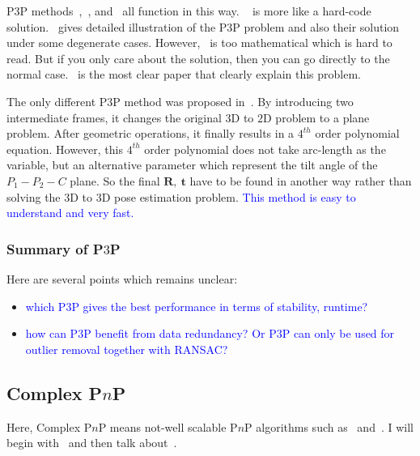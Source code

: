 \documentclass[a4paper]{report}
\begin{document}
P$3$P methods~\cite{fischler1981random},~\cite{gao2003complete}, and~\cite{li2011stable} all function in this way. ~\cite{fischler1981random} is more like a hard-code solution.~\cite{gao2003complete} gives detailed illustration of the P$3$P problem and also their solution under some degenerate cases. However,~\cite{gao2003complete} is too mathematical which is hard to read. But if you only care about the solution, then you can go directly to the normal case.~\cite{li2011stable} is the most clear paper that clearly explain this problem.


The only different P$3$P method was proposed in~\cite{kneip2011novel}. By introducing two intermediate frames, it changes the original $3$D to $2$D problem to a plane problem. After geometric operations, it finally results in a $4^{th}$ order polynomial equation. However, this $4^{th}$ order polynomial does not take arc-length as the variable, but an alternative parameter which represent the tilt angle of the $P_1-P_2-C$ plane. So the final $\mathbf{R},\ \mathbf{t}$ have to be found in another way rather than solving the $3$D to $3$D pose estimation problem. \textcolor{blue}{This method is easy to understand and very fast.}

\subsubsection{Summary of P$3$P}
Here are several points which remains unclear:
\begin{itemize}
\item \textcolor{blue}{which P$3$P gives the best performance in terms of stability, runtime?}
\item \textcolor{blue}{how can P$3$P benefit from data redundancy? Or P$3$P can only be used for outlier removal together with RANSAC?}
\end{itemize}

\subsection{Complex P$n$P}
Here, Complex P$n$P means not-well scalable P$n$P algorithms such as~\cite{quan1999linear} and~\cite{ansar2003linear}. I will begin with~\cite{quan1999linear} and then talk about~\cite{ansar2003linear}.
\end{document}
